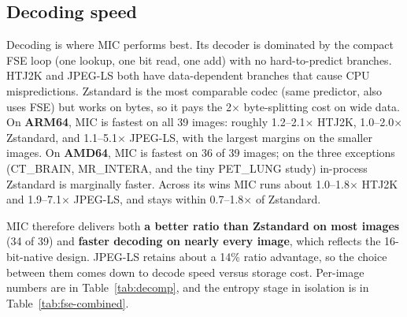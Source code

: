 \documentclass[journal]{IEEEtran}
\begin{document}
\subsection{Decoding speed}

Decoding is where MIC performs best. Its decoder is dominated by the compact
FSE loop (one lookup, one bit read, one add) with no hard-to-predict branches.
HTJ2K and JPEG-LS both have data-dependent branches that cause CPU
mispredictions. Zstandard is the most comparable codec (same predictor, also
uses FSE) but works on bytes, so it pays the 2$\times$ byte-splitting cost on
wide data. On \textbf{ARM64}, MIC is fastest on all 39 images: roughly
1.2--2.1$\times$ HTJ2K, 1.0--2.0$\times$ Zstandard, and 1.1--5.1$\times$
JPEG-LS, with the largest margins on the smaller images. On \textbf{AMD64}, MIC
is fastest on 36 of 39 images; on the three exceptions (CT\_BRAIN, MR\_INTERA,
and the tiny PET\_LUNG study) in-process Zstandard is marginally faster. Across
its wins MIC runs about 1.0--1.8$\times$ HTJ2K and 1.9--7.1$\times$ JPEG-LS, and
stays within 0.7--1.8$\times$ of Zstandard.

MIC therefore delivers both \textbf{a better ratio than Zstandard on most
images} (34 of 39) and \textbf{faster decoding on nearly every image}, which
reflects the 16-bit-native design. JPEG-LS retains about a 14\% ratio
advantage, so the choice between them comes down to decode speed versus storage
cost. Per-image numbers are in Table~\ref{tab:decomp}, and the entropy stage in
isolation is in Table~\ref{tab:fse-combined}.
\end{document}
